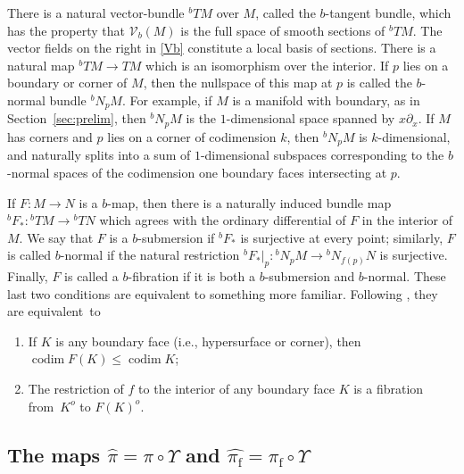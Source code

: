 \documentclass[11pt]{article}
\newcommand{\ie}{i.e.,\xspace}
\newenvironment{enumeratea}
{\bgroup\def\theenumi{\alph{enumi}}\begin{enumerate}}
{\end{enumerate}\egroup}
\DeclareMathOperator{\codim}{codim}
\theoremstyle{plain}
\theoremstyle{definition}
\theoremstyle{remark}
\newcommand{\hpi}{\widehat{\pi}}
\newcommand{\del}{\partial}
\newcommand{\foot}{{\pi_{\mathrm f}}}
\newcommand{\hF}{\widehat{\foot}}
\begin{document}
There is a natural vector-bundle ${}^b TM$ over $M$, called the $b$-tangent bundle, which has the property that
$\mathcal V_b(M)$ is the full space of smooth sections of ${}^b TM$. The vector fields on the right in \eqref{Vb} constitute a local basis of sections. There is a natural map ${}^b TM \to TM$ which is an isomorphism over the interior. If $p$ lies on a boundary or corner of $M$, then the nullspace of this map at $p$ is called the $b$-normal bundle ${}^b N_p M$. For example, if $M$ is a manifold with boundary, as in Section~\ref{sec:prelim}, then ${}^bN_p M$ is the $1$-dimensional space spanned by $x\del_x$. If $M$ has corners and $p$ lies on a corner of codimension $k$, then ${}^bN_p M$ is $k$-dimensional, and naturally splits into a sum of $1$\nobreakdash-dimensional subspaces corresponding to the $b$-normal spaces of the codimension one boundary faces intersecting at $p$.

If $F:M \to N$ is a $b$-map, then there is a naturally induced bundle map ${}^bF_*: {}^bTM \to {}^bTN$ which agrees with the ordinary differential of $F$ in the interior of $M$. We say that $F$ is a $b$-submersion if ${}^b F_*$ is surjective at every point; similarly, $F$ is called $b$-normal if the natural restriction ${}^bF_*|_p: {}^bN_p M \to {}^bN_{f(p)} N$ is surjective. Finally, $F$ is called a $b$-fibration if it is both a $b$-submersion and $b$-normal.
These last two conditions are equivalent to something more familiar. Following \cite[Def.\,3.9]{Grieser2001}, they are
equivalent~to
\begin{enumeratea}
\item
If $K$ is any boundary face (\ie hypersurface or corner), then $\codim  F(K) \le \codim  K$;
\item
The restriction of $f$ to the interior of any boundary face $K$ is a fibration from~$K^o$ to $F(K)^o$.
\end{enumeratea}

\subsection{The maps $\hpi = \pi\circ\Upsilon$ and $\hF = \foot\circ\Upsilon$} \label{ssec:doubleb}
\end{document}
